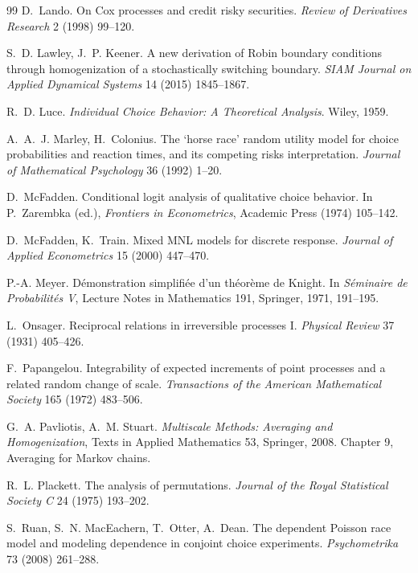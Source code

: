 \documentclass[11pt]{article}
\theoremstyle{remark}
\begin{document}
\begin{thebibliography}{99}
 D.~Lando. On Cox processes and credit risky
securities. \emph{Review of Derivatives Research} 2 (1998) 99--120.

 S.~D. Lawley, J.~P. Keener. A new
derivation of Robin boundary conditions through homogenization of a
stochastically switching boundary. \emph{SIAM Journal on Applied Dynamical
Systems} 14 (2015) 1845--1867.

 R.~D. Luce. \emph{Individual Choice Behavior: A
Theoretical Analysis}. Wiley, 1959.

 A.~A.~J. Marley, H.~Colonius.
The `horse race' random utility model for choice probabilities and reaction
times, and its competing risks interpretation. \emph{Journal of Mathematical
Psychology} 36 (1992) 1--20.

 D.~McFadden. Conditional logit analysis
of qualitative choice behavior. In P.~Zarembka (ed.), \emph{Frontiers in
Econometrics}, Academic Press (1974) 105--142.

 D.~McFadden, K.~Train. Mixed
MNL models for discrete response. \emph{Journal of Applied Econometrics} 15
(2000) 447--470.

 P.-A. Meyer. D\'emonstration simplifi\'ee
d'un th\'eor\`eme de Knight. In \emph{S\'eminaire de Probabilit\'es V},
Lecture Notes in Mathematics 191, Springer, 1971, 191--195.

 L.~Onsager. Reciprocal relations in
irreversible processes I. \emph{Physical Review} 37 (1931) 405--426.

 F.~Papangelou. Integrability of
expected increments of point processes and a related random change of scale.
\emph{Transactions of the American Mathematical Society} 165 (1972) 483--506.

 G.~A. Pavliotis, A.~M.
Stuart. \emph{Multiscale Methods: Averaging and Homogenization}, Texts in
Applied Mathematics 53, Springer, 2008. Chapter 9, Averaging for Markov chains.

 R.~L. Plackett. The analysis of
permutations. \emph{Journal of the Royal Statistical Society C} 24 (1975)
193--202.

S.~Ruan, S.~N. MacEachern, T.~Otter, A.~Dean. The dependent Poisson race model
and modeling dependence in conjoint choice experiments. \emph{Psychometrika}
73 (2008) 261--288.


\end{thebibliography}
\end{document}
